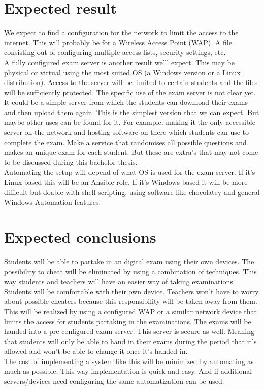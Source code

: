 \documentclass[fleqn,10pt]{voorstel}
\begin{document}
\section{Expected result}
\label{sec:verwachte_resultaten}
We expect to find a configuration for the network to limit the access to the internet. This will probably be for a Wireless Access Point (WAP). A file consisting out of configuring multiple access-lists, security settings, etc. \\
A fully configured exam server is another result we'll expect. This may be physical or virtual using the most suited OS (a Windows version or a Linux distribution). Access to the server will be limited to certain students and the files will be sufficiently protected. The specific use of the exam server is not clear yet. It could be a simple server from which the students can download their exams and then upload them again. This is the simplest version that we can expect. But maybe other uses can be found for it. For example: making it the only accessible server on the network and hosting software on there which students can use to complete the exam. Make a service that randomises all possible questions and makes an unique exam for each student. But these are extra’s that may not come to be discussed during this bachelor thesis. 
\\
Automating the setup will depend of what OS is used for the exam server. If it's Linux based this will be an Ansible role. If it's Windows based it will be more difficult but doable with shell scripting, using software like chocolatey and general Windows Automation features. \\


\section{Expected conclusions}
\label{sec:verwachte_conclusies}

Students will be able to partake in an digital exam using their own devices. The possibility to cheat will be eliminated by using a combination of techniques. This way students and teachers will have an easier way of taking examinations. Students will be comfortable with their own device. Teachers won’t have to worry about possible cheaters because this responsibility will be taken away from them. \\
This will be realized by using a configured WAP or a similar network device that limits the access for students partaking in the examinations. The exams will be handed into a pre-configured exam server. This server is secure as well.  Meaning that students will only be able to hand in their exams during the period that it’s allowed and won’t be able to change it once it’s handed in. \\
The cost of implementing a system like this will be minimized by automating as much as possible. This way implementation is quick and easy. And if additional servers/devices need configuring the same automatization can be used.\\
\end{document}
